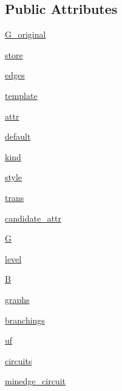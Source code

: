 \subsection*{Public Attributes}
\begin{DoxyCompactItemize}
\item 
\hyperlink{classnetworkx_1_1algorithms_1_1tree_1_1branchings_1_1Edmonds_a29657801756bc92c6df922a57661a189}{G\+\_\+original}
\item 
\hyperlink{classnetworkx_1_1algorithms_1_1tree_1_1branchings_1_1Edmonds_a15a6593d66587ddb61673f2d76a05fa2}{store}
\item 
\hyperlink{classnetworkx_1_1algorithms_1_1tree_1_1branchings_1_1Edmonds_a0fb0c329d8d59bddb9b2ee6375ca9fb7}{edges}
\item 
\hyperlink{classnetworkx_1_1algorithms_1_1tree_1_1branchings_1_1Edmonds_a7d1c78c802cd949794171d96a5a81943}{template}
\item 
\hyperlink{classnetworkx_1_1algorithms_1_1tree_1_1branchings_1_1Edmonds_a0c066fa3ee5d523fa4ecae69fe188c74}{attr}
\item 
\hyperlink{classnetworkx_1_1algorithms_1_1tree_1_1branchings_1_1Edmonds_a8f4eec9d5fdb440ccf2aa7106e429999}{default}
\item 
\hyperlink{classnetworkx_1_1algorithms_1_1tree_1_1branchings_1_1Edmonds_a0f7ebe7aed0795174669792be9077f82}{kind}
\item 
\hyperlink{classnetworkx_1_1algorithms_1_1tree_1_1branchings_1_1Edmonds_a30c10eb568d6c7d2dfd3f4291f642897}{style}
\item 
\hyperlink{classnetworkx_1_1algorithms_1_1tree_1_1branchings_1_1Edmonds_ace16846d750720c6a5d5174e95c7b214}{trans}
\item 
\hyperlink{classnetworkx_1_1algorithms_1_1tree_1_1branchings_1_1Edmonds_a894e5bdaea92a2a42a8ce7fd4785669f}{candidate\+\_\+attr}
\item 
\hyperlink{classnetworkx_1_1algorithms_1_1tree_1_1branchings_1_1Edmonds_a9b2508114a6f8f778d0d1758650eda7e}{G}
\item 
\hyperlink{classnetworkx_1_1algorithms_1_1tree_1_1branchings_1_1Edmonds_a0f41158470e46de1f758df8b5e16a9fd}{level}
\item 
\hyperlink{classnetworkx_1_1algorithms_1_1tree_1_1branchings_1_1Edmonds_a31539bd4e9c1ad9bc5413fc38bbf6959}{B}
\item 
\hyperlink{classnetworkx_1_1algorithms_1_1tree_1_1branchings_1_1Edmonds_ac99a85c09533d19f4c3f54f1672a0a98}{graphs}
\item 
\hyperlink{classnetworkx_1_1algorithms_1_1tree_1_1branchings_1_1Edmonds_a02aef231732422fd059f5741c78ee1bf}{branchings}
\item 
\hyperlink{classnetworkx_1_1algorithms_1_1tree_1_1branchings_1_1Edmonds_a41d9edf6eb9e9c5d973312b21c8e8dad}{uf}
\item 
\hyperlink{classnetworkx_1_1algorithms_1_1tree_1_1branchings_1_1Edmonds_acebee4f632707c8fb8d76a2100826acf}{circuits}
\item 
\hyperlink{classnetworkx_1_1algorithms_1_1tree_1_1branchings_1_1Edmonds_abef52c0686fc2e96b4c4a5b0062fcfff}{minedge\+\_\+circuit}
\end{DoxyCompactItemize}


